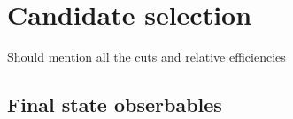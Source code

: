 \section{Candidate selection}
Should mention all the cuts and relative efficiencies
\subsection{Final state obserbables}
